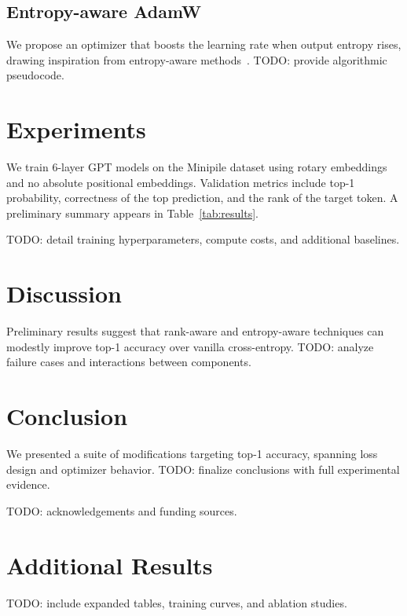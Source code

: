 \documentclass{article}
\begin{document}
\subsection{Entropy-aware AdamW}
We propose an optimizer that boosts the learning rate when output entropy rises, drawing inspiration from entropy-aware methods~\cite{chaudhari2019entropy}. TODO: provide algorithmic pseudocode.

\section{Experiments}
We train 6-layer GPT models on the Minipile dataset using rotary embeddings and no absolute positional embeddings. Validation metrics include top-1 probability, correctness of the top prediction, and the rank of the target token. A preliminary summary appears in Table~\ref{tab:results}.



TODO: detail training hyperparameters, compute costs, and additional baselines.

\section{Discussion}
Preliminary results suggest that rank-aware and entropy-aware techniques can modestly improve top-1 accuracy over vanilla cross-entropy. TODO: analyze failure cases and interactions between components.

\section{Conclusion}
We presented a suite of modifications targeting top-1 accuracy, spanning loss design and optimizer behavior. TODO: finalize conclusions with full experimental evidence.

\begin{ack}
TODO: acknowledgements and funding sources.
\end{ack}




\appendix
\section{Additional Results}
TODO: include expanded tables, training curves, and ablation studies.
\end{document}
